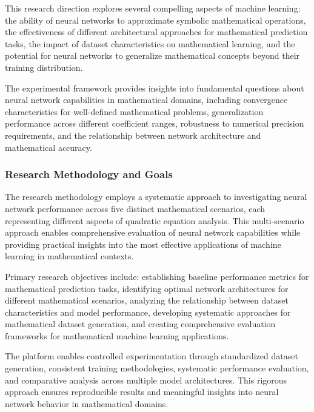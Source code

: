 \documentclass[11pt,a4paper]{report}
\begin{document}
This research direction explores several compelling aspects of machine learning: the ability of neural networks to approximate symbolic mathematical operations, the effectiveness of different architectural approaches for mathematical prediction tasks, the impact of dataset characteristics on mathematical learning, and the potential for neural networks to generalize mathematical concepts beyond their training distribution.

The experimental framework provides insights into fundamental questions about neural network capabilities in mathematical domains, including convergence characteristics for well-defined mathematical problems, generalization performance across different coefficient ranges, robustness to numerical precision requirements, and the relationship between network architecture and mathematical accuracy.

\subsubsection{Research Methodology and Goals}

The research methodology employs a systematic approach to investigating neural network performance across five distinct mathematical scenarios, each representing different aspects of quadratic equation analysis. This multi-scenario approach enables comprehensive evaluation of neural network capabilities while providing practical insights into the most effective applications of machine learning in mathematical contexts.

Primary research objectives include: establishing baseline performance metrics for mathematical prediction tasks, identifying optimal network architectures for different mathematical scenarios, analyzing the relationship between dataset characteristics and model performance, developing systematic approaches for mathematical dataset generation, and creating comprehensive evaluation frameworks for mathematical machine learning applications.

The platform enables controlled experimentation through standardized dataset generation, consistent training methodologies, systematic performance evaluation, and comparative analysis across multiple model architectures. This rigorous approach ensures reproducible results and meaningful insights into neural network behavior in mathematical domains.
\end{document}
